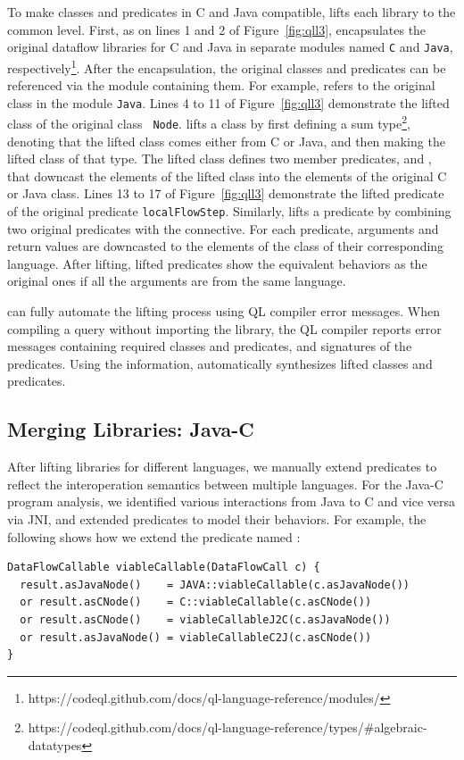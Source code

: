 To make classes and predicates in C and Java compatible, \ours lifts each
library to the common level.  First, as on lines 1 and 2 of
Figure~\ref{fig:qll3}, \ours encapsulates the original dataflow libraries for C
and Java in separate modules named {\tt C} and {\tt Java},
respectively\footnote{https://codeql.github.com/docs/ql-language-reference/modules/}.
After the encapsulation, the original classes and predicates can be referenced
via the module containing them.  For example,  refers to the
original class  in the module {\tt Java}.  Lines 4 to 11 of
Figure~\ref{fig:qll3} demonstrate the lifted class of the original class {\tt
Node}.  \ours lifts a class by first defining a sum
type\footnote{https://codeql.github.com/docs/ql-language-reference/types/\#algebraic-datatypes},
denoting that the lifted class comes either from C or Java, and then making the
lifted class of that type.  The lifted class defines two member predicates,
 and , that downcast the elements of the
lifted class into the elements of the original C or Java class.  Lines 13 to 17
of Figure~\ref{fig:qll3} demonstrate the lifted predicate of the original
predicate {\tt localFlowStep}.  Similarly, \ours lifts a predicate by combining
two original predicates with the  connective. For each predicate,
arguments and return values are downcasted to the elements of the class of
their corresponding language.  After lifting, lifted predicates show the
equivalent behaviors as the original ones if all the arguments are from the
same language.

\ours can fully automate the lifting process using QL compiler error messages.
When compiling a query without importing the library, the QL compiler reports
error messages containing required classes and predicates, and signatures of
the predicates. Using the information, \ours automatically synthesizes lifted
classes and predicates.

\subsection{Merging Libraries: Java-C}\label{sec:merging}
After lifting libraries for different languages, we manually extend predicates
to reflect the interoperation semantics between multiple languages.  For the
Java-C program analysis, we identified various interactions from Java to C and
vice versa via JNI, and extended predicates to model their behaviors.  For
example, the following shows how we extend the predicate
named :
\begin{lstlisting}[style=codeql,xleftmargin=2.5em]
DataFlowCallable viableCallable(DataFlowCall c) {
  result.asJavaNode()    = JAVA::viableCallable(c.asJavaNode())
  or result.asCNode()    = C::viableCallable(c.asCNode())
  or result.asCNode()    = viableCallableJ2C(c.asJavaNode())
  or result.asJavaNode() = viableCallableC2J(c.asCNode())
}
\end{lstlisting}

